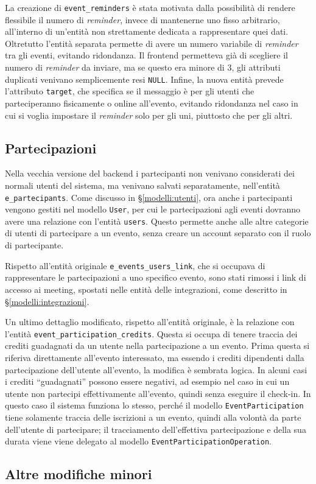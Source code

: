 \noindent La creazione di \verb|event_reminders| è stata motivata dalla possibilità di rendere flessibile il numero di \emph{reminder}, invece di mantenerne uno fisso arbitrario, all'interno di un'entità non strettamente dedicata a rappresentare quei dati. Oltretutto l'entità separata permette di avere un numero variabile di \emph{reminder} tra gli eventi, evitando ridondanza. Il frontend permetteva già di scegliere il numero di \emph{reminder} da inviare, ma se questo era minore di 3, gli attributi duplicati venivano semplicemente resi \verb|NULL|. Infine, la nuova entità prevede l'attributo \verb|target|, che specifica se il messaggio è per gli utenti che parteciperanno fisicamente o online all'evento, evitando ridondanza nel caso in cui si voglia impostare il \emph{reminder} solo per gli uni, piuttosto che per gli altri.


\subsection{Partecipazioni}
Nella vecchia versione del backend i partecipanti non venivano considerati dei normali utenti del sistema, ma venivano salvati separatamente, nell'entità \verb|e_partecipants|. Come discusso in \S \ref{modelli:utenti}, ora anche i partecipanti vengono gestiti nel modello \verb|User|, per cui le partecipazioni agli eventi dovranno avere una relazione con l'entità \verb|users|. Questo permette anche alle altre categorie di utenti di partecipare a un evento, senza creare un account separato con il ruolo di partecipante.

Rispetto all'entità originale \verb|e_events_users_link|, che si occupava di rappresentare le partecipazioni a uno specifico evento, sono stati rimossi i link di accesso ai meeting, spostati nelle entità delle integrazioni, come descritto in \S \ref{modelli:integrazioni}.

Un ultimo dettaglio modificato, rispetto all'entità originale, è la relazione con l'entità \verb|event_participation_credits|. Questa si occupa di tenere traccia dei crediti guadagnati da un utente nella partecipazione a un evento. Prima questa si riferiva direttamente all'evento interessato, ma essendo i crediti dipendenti dalla partecipazione dell'utente all'evento, la modifica è sembrata logica. In alcuni casi i crediti ``guadagnati'' possono essere negativi, ad esempio nel caso in cui un utente non partecipi effettivamente all'evento, quindi senza eseguire il check-in. In questo caso il sistema funziona lo stesso, perché il modello \verb|EventParticipation| tiene solamente traccia delle iscrizioni a un evento, quindi alla volontà da parte dell'utente di partecipare; il tracciamento dell'effettiva partecipazione e della sua durata viene viene delegato al modello \verb|EventParticipationOperation|.


\subsection{Altre modifiche minori}

